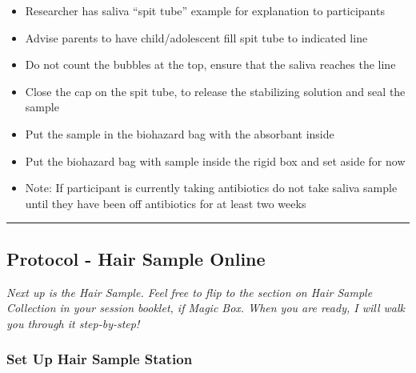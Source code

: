 \documentclass[]{book}
\providecommand{\tightlist}{%
  \setlength{\itemsep}{0pt}\setlength{\parskip}{0pt}}
\begin{document}
\begin{itemize}
\tightlist
\item
  Researcher has saliva ``spit tube'' example for explanation to participants
\item
  Advise parents to have child/adolescent fill spit tube to indicated line
\item
  Do not count the bubbles at the top, ensure that the saliva reaches the line
\item
  Close the cap on the spit tube, to release the stabilizing solution and seal the sample
\item
  Put the sample in the biohazard bag with the absorbant inside
\item
  Put the biohazard bag with sample inside the rigid box and set aside for now
\item
  Note: If participant is currently taking antibiotics do not take saliva sample until they have been off antibiotics for at least two weeks
\end{itemize}

\begin{center}\rule{0.5\linewidth}{0.5pt}\end{center}

\hypertarget{protocol---hair-sample-online}{%
\subsection{Protocol - Hair Sample Online}\label{protocol---hair-sample-online}}

\emph{Next up is the Hair Sample. Feel free to flip to the section on Hair Sample Collection in your session booklet, if Magic Box. When you are ready, I will walk you through it step-by-step!}

\hypertarget{set-up-hair-sample-station-1}{%
\subsubsection{Set Up Hair Sample Station}\label{set-up-hair-sample-station-1}}
\end{document}
